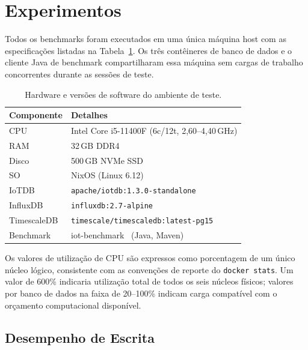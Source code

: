 \section{Experimentos}
\label{sec:experiments}


Todos os benchmarks foram executados em uma única máquina host com as especificações listadas
na Tabela~\ref{tab:hardware}. Os três contêineres de banco de dados e o cliente Java de
benchmark compartilharam essa máquina sem cargas de trabalho concorrentes durante as sessões
de teste.

\begin{table}[t]
  \centering
  \caption{Hardware e versões de software do ambiente de teste.}
  \label{tab:hardware}
  \begin{tabular}{ll}
    \hline
    \textbf{Componente} & \textbf{Detalhes} \\
    \hline
    CPU       & Intel Core i5-11400F (6c/12t, 2,60--4,40\,GHz) \\
    RAM       & 32\,GB DDR4 \\
    Disco     & 500\,GB NVMe SSD \\
    SO        & NixOS (Linux 6.12) \\
    \hline
    IoTDB       & \texttt{apache/iotdb:1.3.0-standalone} \\
    InfluxDB    & \texttt{influxdb:2.7-alpine} \\
    TimescaleDB & \texttt{timescale/timescaledb:latest-pg15} \\
    Benchmark   & iot-benchmark~\citep{iotbenchmark} (Java, Maven) \\
    \hline
  \end{tabular}
\end{table}

Os valores de utilização de CPU são expressos como porcentagem de um único núcleo lógico,
consistente com as convenções de reporte do \texttt{docker stats}. Um valor de 600\% indicaria
utilização total de todos os seis núcleos físicos; valores por banco de dados na faixa de
20--100\% indicam carga compatível com o orçamento computacional disponível.

\subsection{Desempenho de Escrita}
\label{sec:write-results}

